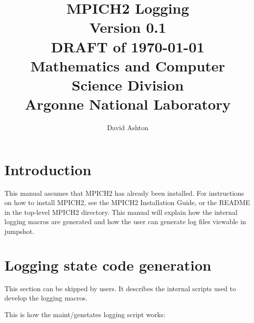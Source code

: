 \documentclass[dvipdfm,11pt]{article}
\begin{document}
\title{MPICH2 Logging\\
Version 0.1\\
DRAFT of \today\\
Mathematics and Computer Science Division\\
Argonne National Laboratory}

\author{David Ashton}


\maketitle

\cleardoublepage

\tableofcontents
\clearpage

\pagestyle{headings}


\section{Introduction}
\label{sec:introduction}

This manual assumes that MPICH2 has already been installed.  For
instructions on how to install MPICH2, see the MPICH2 Installation Guide,
or the README in the top-level MPICH2 directory.  This manual will
explain how the internal logging macros are generated and how the user
can generate log files viewable in jumpshot.


\section{Logging state code generation}
\label{sec:genstates}

This section can be skipped by users.  It describes the internal scripts used
to develop the logging macros.

This is how the maint/genstates logging script works:
\end{document}
